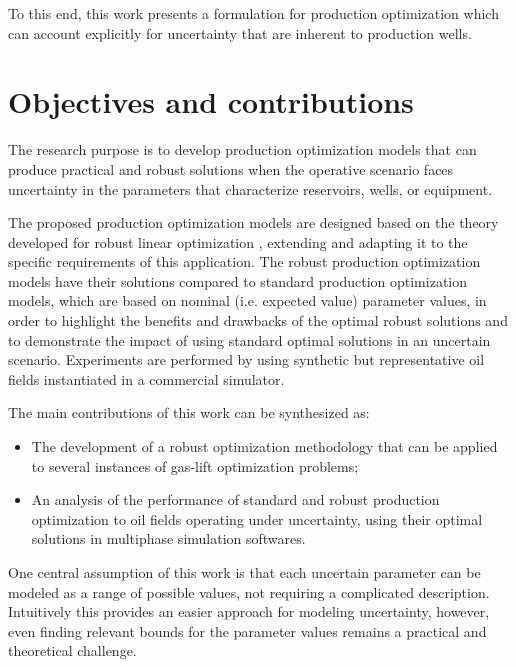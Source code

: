 %
To this end, this work presents a formulation for production optimization which can account explicitly for uncertainty that are inherent to production wells.
%
\section{Objectives and contributions}
The research purpose is to develop production optimization models that can produce  practical and robust solutions when the operative scenario faces uncertainty in the parameters that characterize reservoirs, wells, or equipment.
%

The proposed production optimization models are designed based on the theory developed for robust linear optimization \cite{Ben-Tal1999,Nemirovski2000,AharonBen-Tal2009,Bertismas2011}, extending and adapting it to the specific requirements of this application.
%
The robust production optimization models have their solutions compared to standard production optimization models, which are based on nominal (i.e. expected value) parameter values, in order to highlight the benefits and drawbacks of the optimal robust solutions and to demonstrate the impact of using standard optimal solutions in an uncertain scenario.
%
Experiments are performed by using synthetic but representative oil fields instantiated in a commercial simulator.
%

The main contributions of this work can be synthesized as:
%
\begin{itemize}
 \item The development of a robust optimization methodology that can be applied to several instances of gas-lift optimization problems;
 \item An analysis of the performance of standard and robust production optimization to oil fields operating under uncertainty, using their optimal solutions in multiphase simulation softwares.
\end{itemize}
%

One central assumption of this work is that each uncertain parameter can be modeled as a range of possible values, not requiring a complicated description. Intuitively this provides an easier approach for modeling uncertainty, however, even finding relevant bounds for the parameter values remains a practical and theoretical challenge.
%
